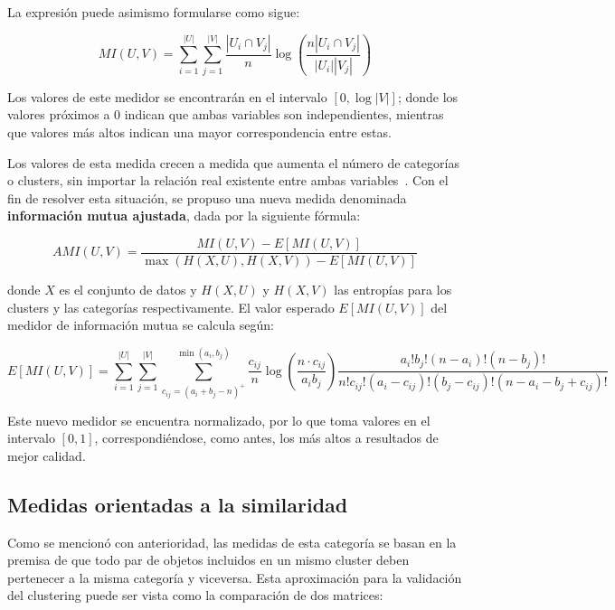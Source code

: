 La expresión puede asimismo formularse como sigue:

\begin{equation}
    \label{eq:mutual-information-cardinality}
    MI(U,V) = \sum_{i=1}^{|U|}\sum_{j=1}^{|V|}{\frac{|U_i \cap V_j|}{n}\log{\left( \frac{n|U_i \cap V_j|}{|U_i||V_j|} \right)}}
\end{equation}

Los valores de este medidor se encontrarán en el intervalo $[0,\log{|V|}]$;
donde los valores próximos a 0 indican que ambas variables son independientes, mientras que valores más altos indican una mayor correspondencia entre estas.

Los valores de esta medida crecen a medida que aumenta el número de categorías o clusters, sin importar la relación real existente entre ambas variables~\cite{Vinh10}.
Con el fin de resolver esta situación, se propuso una nueva medida denominada \textbf{información mutua ajustada}, dada por la siguiente fórmula:

\begin{equation}
    \label{eq:adjusted-mutual-information}
    AMI(U,V) = \frac{MI(U,V) - E[MI(U,V)]}{\max{(H(X, U), H(X, V)) - E[MI(U,V)]}}
\end{equation}

\noindent
donde $X$ es el conjunto de datos y $H(X,U)$ y $H(X,V)$ las entropías para los clusters y las categorías respectivamente.
El valor esperado $E[MI(U,V)]$ del medidor de información mutua se calcula según:

{\footnotesize
\begin{equation*}
    \label{eq:expected-value-mutual-information}
    E[MI(U,V)] = \sum_{i=1}^{|U|}\sum_{j=1}^{|V|}\sum_{c_{ij}=(a_i+b_j-n)^{+}}^{\min{(a_i,b_j)}}
    {
    \frac{c_{ij}}{n}
    \log{\left( \frac{n \cdot c_{ij}}{a_i b_j} \right)}
    \frac{a_i ! b_j ! (n-a_i)!(n-b_j)!}{n!c_{ij}!(a_i-c_{ij})!(b_j-c_{ij})!(n-a_i-b_j+c_{ij})!}
    }
\end{equation*}
}

Este nuevo medidor se encuentra normalizado, por lo que toma valores en el intervalo $[0, 1]$, correspondiéndose, como antes, los más altos a resultados de mejor calidad.

\subsection{Medidas orientadas a la similaridad}\label{subsec:medidasOrientadasALaSimilaridad}

Como se mencionó con anterioridad, las medidas de esta categoría se basan en la premisa de que todo par de objetos incluidos en un mismo cluster deben pertenecer a la misma categoría y viceversa.
Esta aproximación para la validación del clustering puede ser vista como la comparación de dos matrices:

